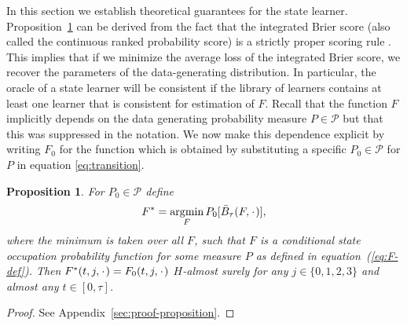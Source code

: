 \documentclass{statsoc}
\numberwithin{theorem}{section}
\newtheorem{proposition}[theorem]{Proposition}
\DeclareMathOperator{\E}{\mathbb{E}} %
\newcommand{\blank}{\makebox[1ex]{\textbf{$\cdot$}}}
\renewcommand{\phi}{\varphi}
\newcommand{\1}{\mathds{1}}
\DeclareMathOperator*{\argmin}{\arg\!\min}
\begin{document}
In this section we establish theoretical guarantees for the state learner.
Proposition~\ref{prop:stric-prop} can be derived from the fact that the
integrated Brier score (also called the continuous ranked probability score) is
a strictly proper scoring rule \citep{gneiting2007strictly}. This implies that
if we minimize the average loss of the integrated Brier score, we recover the
parameters of the data-generating distribution. In particular, the oracle of a
state learner will be consistent if the library of learners contains at least
one learner that is consistent for estimation of \( F \). Recall that the
function \(F\) implicitly depends on the data generating probability measure
\(P\in\mathcal P\) but that this was suppressed in the notation. We now make
this dependence explicit by writing \(F_0\) for the function which is obtained
by substituting a specific \(P_0\in\mathcal{P}\) for \(P\) in equation
\eqref{eq:transition}.

\begin{proposition}
  \label{prop:stric-prop}
  For \(P_0\in\mathcal{P}\) define
  \begin{equation*}
    F^* = \argmin_{F} P_0{[\bar{B}_\tau(F, \blank)]},
\end{equation*}
where the minimum is taken over all \( F \), such that \( F \) is a conditional
state occupation probability function for some measure \( P \) as defined in equation~(\ref{eq:F-def}).
Then \( F^*(t,j,\blank) = F_0(t,j,\blank) \) \( H \)-almost surely for
any \( j\in \{0,1,2,3\} \) and almost any \( t \in [0, \tau]\).
\end{proposition}
\begin{proof}
  See Appendix~\ref{sec:proof-proposition}.
\end{proof}
\end{document}
